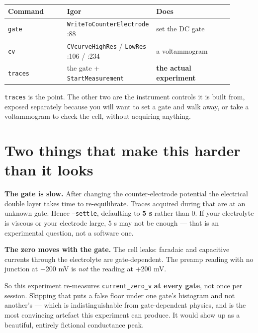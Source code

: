 \small\setlength{\LTleft}{0pt}\setlength{\LTright}{\fill}
\begin{longtable}{@{}>{\raggedright\arraybackslash}p{0.26\linewidth}>{\raggedright\arraybackslash}p{0.30\linewidth}>{\raggedright\arraybackslash}p{0.34\linewidth}@{}}
\toprule
\textbf{Command} & \textbf{Igor} & \textbf{Does} \\
\midrule\endhead
\texttt{gate} & \texttt{Write\discretionary{}{}{}To\discretionary{}{}{}Counter\discretionary{}{}{}Electrode} :88 & set the DC gate \\
\texttt{cv} & \texttt{CVcurve\discretionary{}{}{}High\discretionary{}{}{}Res} / \texttt{Low\discretionary{}{}{}Res} :106 / :234 & a voltammogram \\
\texttt{traces} & the gate + \texttt{Start\discretionary{}{}{}Measurement} & \textbf{the actual experiment} \\
\bottomrule
\end{longtable}
\normalsize

\texttt{traces} is the point. The other two are the instrument controls it is built from, exposed separately because you will want to set a gate and walk away, or take a voltammogram to check the cell, without acquiring anything.

\section{Two things that make this harder than it looks}

\textbf{The gate is slow.} After changing the counter-electrode potential the electrical double layer takes time to re-equilibrate. Traces acquired during that are at an unknown gate. Hence \texttt{--settle}, defaulting to \textbf{5 s} rather than 0. If your electrolyte is viscous or your electrode large, 5 s may not be enough --- that is an experimental question, not a software one.

\textbf{The zero moves with the gate.} The cell leaks: faradaic and capacitive currents through the electrolyte are gate-dependent. The preamp reading with no junction at −200 mV is \emph{not} the reading at +200 mV.

So this experiment re-measures \texttt{current\_\discretionary{}{}{}zero\_\discretionary{}{}{}v} \textbf{at every gate}, not once per session. Skipping that puts a false floor under one gate's histogram and not another's --- which is indistinguishable from gate-dependent physics, and is the most convincing artefact this experiment can produce. It would show up as a beautiful, entirely fictional conductance peak.

